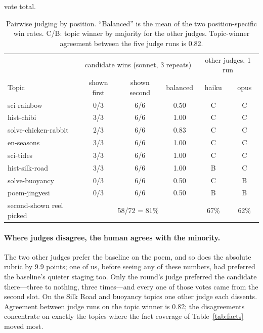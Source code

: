 \documentclass[11pt]{article}
\begin{document}
vote total.
\begin{table}[t]
\centering\small
\begin{tabular}{lccc|cc}
\toprule
 & \multicolumn{3}{c|}{candidate wins (sonnet, 3 repeats)} & \multicolumn{2}{c}{other judges, 1 run} \\
Topic & shown first & shown second & balanced & haiku & opus \\
\midrule
sci-rainbow & 0/3 & 6/6 & 0.50 & C & C \\
hist-chibi & 3/3 & 6/6 & 1.00 & C & C \\
solve-chicken-rabbit & 2/3 & 6/6 & 0.83 & C & C \\
en-seasons & 3/3 & 6/6 & 1.00 & C & C \\
sci-tides & 3/3 & 6/6 & 1.00 & C & C \\
hist-silk-road & 3/3 & 6/6 & 1.00 & B & C \\
solve-buoyancy & 0/3 & 6/6 & 0.50 & C & B \\
poem-jingyesi & 0/3 & 6/6 & 0.50 & B & B \\
\midrule
second-shown reel picked & \multicolumn{3}{c|}{58/72 = 81\%} & 67\% & 62\% \\
\bottomrule
\end{tabular}
\caption{Pairwise judging by position. ``Balanced'' is the mean of the two position-specific win
rates. C/B: topic winner by majority for the other judges. Topic-winner agreement between the five
judge runs is 0.82.}
\label{tab:position}
\end{table}

\paragraph{Where judges disagree, the human agrees with the minority.} The two other judges prefer the
baseline on the poem, and so does the absolute rubric by 9.9 points; one of us, before seeing any of
these numbers, had preferred the baseline's quieter staging too. Only the round's judge preferred the
candidate there---three to nothing, three times---and every one of those votes came from the second
slot. On the Silk Road and buoyancy topics one other judge each dissents. Agreement between judge runs
on the topic winner is 0.82; the disagreements concentrate on exactly the topics where the fact
coverage of Table~\ref{tab:facts} moved most.
\end{document}
